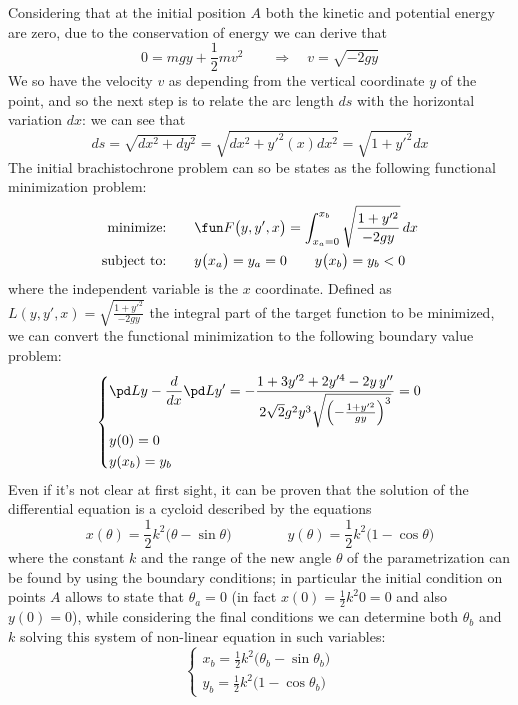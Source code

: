 	Considering that at the initial position $A$ both the kinetic and potential energy are zero, due to the conservation of energy we can derive that
	\[ 0 = mgy + \frac 1 2 m v^2 \qquad \Rightarrow \quad v = \sqrt{-2gy} \]
	We so have the velocity $v$ as depending from the vertical coordinate $y$ of the point, and so the next step is to relate the arc length $ds$ with the horizontal variation $dx$: we can see that
	\[ ds = \sqrt{dx^2 + dy^2} = \sqrt{dx^2 + y'^2(x)dx^2} = \sqrt{1 + y'^2} dx \] 
	The initial brachistochrone problem can so be states as the following functional minimization problem:
	\begin{align*}
		\textrm{minimize:} \qquad & \fun F\big(y, y', x\big) = \int_{x_a = 0}^{x_b} \sqrt{\frac{1+y'^2}{-2gy}}\, dx \\
		\textrm{subject to:} \qquad & y\big(x_a\big) = y_a = 0 \qquad y\big(x_b\big) = y_b < 0
	\end{align*}
	where the independent variable is the $x$ coordinate. Defined as $L(y,y',x) = \sqrt{\frac{1+y'^2}{-2gy}}$  the integral part of the target function to be minimized, we can convert the functional minimization to the following boundary value problem:
	\[ \left\{ \begin{aligned}
		&\pd L y - \frac d{dx} \pd L {y'} = -\frac{1+3 y'^2 + 2y'^4 - 2 y \, y''}{2\sqrt 2 g^2 y^3 \sqrt{\left(- \frac{1 + y'^2}{gy}\right)^3}} =  0 \\
		&y(0) = 0 \\
		&y(x_b) = y_b
	\end{aligned} \right. \]
	Even if it's not clear at first sight, it can be proven that the solution of the differential equation is a cycloid described by the equations
	\[ x(\theta) = \frac 1 2 k^2 \big(\theta-\sin\theta\big) \qquad \qquad y(\theta) = \frac 1 2 k^2 \big(1-\cos\theta \big) \] 
	where the constant $k$ and the range of the new angle $\theta$ of the parametrization can be found by using the boundary conditions; in particular the initial condition on points $A$ allows to state that $\theta_a = 0$ (in fact $x(0) = \frac 1 2 k^ 2 0 = 0$ and also $y(0) = 0$), while considering the final conditions we can determine both $\theta_b$ and $k$ solving this system of non-linear equation in such variables:
	\[ \begin{cases}
		x_b = \frac 1 2 k^2 \big(\theta_b - \sin\theta_b\big) \\
		y_b = \frac 1 2 k^2 \big(1-\cos\theta_b\big)
	\end{cases} \]
	
	
	
	


















